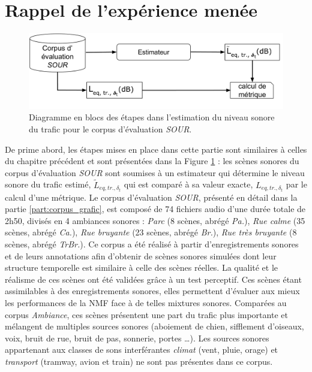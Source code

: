 \section{Rappel de l'expérience menée}\label{part:rappelExp}
 

\begin{figure}[ht]
\centering
\includegraphics[width=0.9\linewidth]{./figures/NMF/Bloc_diagram_estimateur_SOUR.pdf}
\caption{Diagramme en blocs des étapes dans l'estimation du niveau sonore du trafic pour le corpus d'évaluation \textit{SOUR}.}
\label{fig:diagram_SOUR}
\end{figure}


De prime abord, les étapes mises en place dans cette partie sont similaires à celles du chapitre précédent et sont présentées dans la Figure \ref{fig:diagram_SOUR} : les scènes sonores du corpus d'évaluation \textit{SOUR} sont soumises à un estimateur qui détermine le niveau sonore du trafic estimé, $\tilde{L}_{eq,tr.,\delta_t}$ qui est comparé à sa valeur exacte, $L_{eq,tr.,\delta_t}$ par le calcul d'une métrique.
Le corpus d'évaluation \textit{SOUR}, présenté en détail dans la partie \ref{part:corpus_grafic}, est composé de 74 fichiers audio d'une durée totale de 2h50, divisés en 4 ambiances sonores : \textit{Parc} (8 scènes, abrégé \textit{Pa.}), \textit{Rue calme} (35 scènes, abrégé \textit{Ca.}), \textit{Rue bruyante} (23 scènes, abrégé \textit{Br.}), \textit{Rue très bruyante} (8 scènes, abrégé \textit{TrBr.}). Ce corpus a été réalisé à partir d'enregistrements sonores et de leurs annotations afin d'obtenir de scènes sonores simulées dont leur structure temporelle est similaire à celle des scènes réelles. La qualité et le réalisme de ces scènes ont été validées grâce à un test perceptif. Ces scènes étant assimilables à des enregistrements sonores, elles permettent d'évaluer aux mieux les performances de la NMF face à de telles mixtures sonores. Comparées au corpus \textit{Ambiance}, ces scènes présentent une part du trafic plus importante et mélangent de multiples sources sonores (aboiement de chien, sifflement d'oiseaux, voix, bruit de rue, bruit de pas, sonnerie, portes \dots{}). Les sources sonores appartenant aux classes de sons interférantes \textit{climat} (vent, pluie, orage) et \textit{transport} (tramway, avion et train) ne sont pas présentes dans ce corpus.

